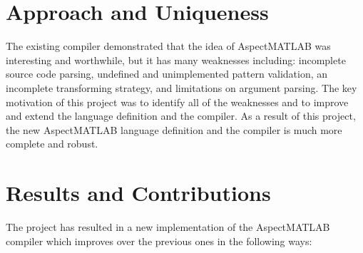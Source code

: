 \documentclass[preprint]{sig-alternate-05-2015}
\begin{document}
\section{Approach and Uniqueness}

The existing compiler demonstrated that the idea of AspectMATLAB was
interesting and worthwhile,  but it has many weaknesses including:
incomplete source code parsing, undefined and unimplemented pattern
validation, an incomplete transforming strategy, and limitations on
argument parsing.  The key motivation of this project was to identify
all of the weaknesses and to improve and extend the language definition
and the compiler.  As a result of this project, the new AspectMATLAB
language definition and the compiler is much more complete and robust.

\section{Results and Contributions}

The project has resulted in a new implementation of the AspectMATLAB
compiler which improves over the previous ones in the following ways:
\end{document}
